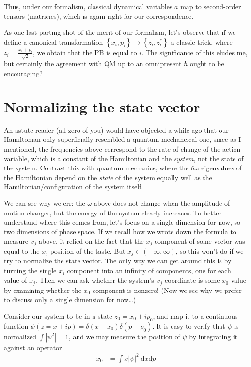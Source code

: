\documentclass[12pt]{report}
\newcommand*{\abs}[1]{\left|#1\right|}
\begin{document}
Thus, under our formalism, classical dynamical variables $a$ map to second-order
tensors (matricies), which is again right for our correspondence.

As one last parting shot of the merit of our formalism, let's observe that if we
define a canonical transformation $\left\{ x_i, p_i \right\} \to \left\{ z_i,
z_i^* \right\}$ a classic trick, where $z_i = \frac{x_i + p_i}{\sqrt{2}}$, we
obtain that the PB is equal to $i$. The significance of this eludes me, but
certainly the agreement with QM up to an omnipresent $\hbar$ ought to be
encouraging?


\section{Normalizing the state vector}

An astute reader (all zero of you) would have objected a while ago that our
Hamiltonian only superficially resembled a quantum mechancical one, since as I
mentioned, the frequencies above correspond to the rate of change of the action
variable, which is a constant of the Hamiltonian and the \emph{system}, not the
state of the system. Contrast this with quantum mechanics, where the $\hbar
\omega$ eigenvalues of the Hamiltonian depend on the \emph{state} of the system
equally well as the Hamiltonian/configuration of the system itself.

We can see why we err: the $\omega$ above does not change when the amplitude of
motion changes, but the energy of the system clearly increases. To better
understand where this comes from, let's focus on a single dimension for now, so
two dimensions of phase space. If we recall how we wrote down the formula to
measure $x_j$ above, it relied on the fact that the $x_j$ component of some
vector was equal to the $x_j$ position of the taste. But $x_j \in \left(
-\infty,\infty \right)$, so this won't do if we try to normalize the state
vector. The only way we can get around this is by turning the single $x_j$
component into an infinity of components, one for each value of $x_j$. Then we
can ask whether the system's $x_j$ coordinate is some $x_0$ value by examining
whether the $x_0$ component is nonzero! (Now we see why we prefer to discuss
only a single dimension for now\dots)

Consider our system to be in a state $z_0 = x_0 + ip_0$, and map it to a
continuous function $\psi(z=x+ip) = \delta(x-x_0)\delta(p-p_0)$. It is easy to
verify that $\psi$ is normalized $\int \abs{\psi^2} = 1$, and we may measure the
position of $\psi$ by integrating it against an operator
\begin{align}
    x_0 &= \int x \abs{\psi}^2 \;\mathrm{d}x\mathrm{d}p
\end{align}
\end{document}
